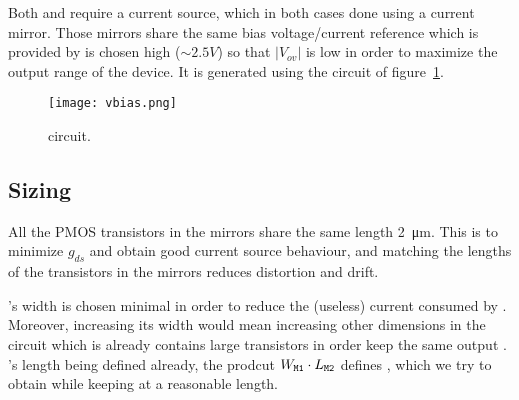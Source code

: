 Both  and  require a current source, which in both cases done using a current mirror.
Those mirrors share the same bias voltage/current reference which is provided by 
 is chosen high ($\sim{2.5}{V}$) so that $|V_{ov}|$ is low in order to maximize the output range of the device.
It is generated using the circuit of figure~\ref{fig:vbias}.
\begin{figure}
  \centering
  \texttt{[image: vbias.png]}
  \caption{ circuit.\label{fig:vbias}}
\end{figure}

\subsection{Sizing}
All the PMOS transistors in the mirrors share the same length \SI{2}{\micro\meter}. This is to minimize $g_{ds}$ and obtain good current source behaviour, and matching the lengths of the transistors in the mirrors reduces distortion and drift.

's width is chosen minimal in order to reduce the (useless) current consumed by . Moreover, increasing its width would mean increasing other dimensions in the circuit which is already contains large transistors in order keep the same output . 's length being defined already, the prodcut $W_{\mathtt{M1}} \cdot L_{\mathtt{M2}}$ defines , which we try to obtain while keeping  at a reasonable length.
